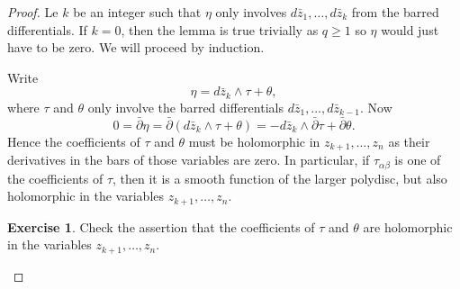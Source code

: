\documentclass[12pt,openany]{book}
\theoremstyle{plain}
\theoremstyle{remark}
\theoremstyle{definition}
\newenvironment{exbox}{%
    \def\FrameCommand{\vrule width 1pt \relax\hspace{10pt}}%
    \MakeFramed{\advance\hsize-\width\FrameRestore}%
}{%
    \endMakeFramed
}
\theoremstyle{exercise}
\newtheorem{exercise}{Exercise}[section]
\theoremstyle{example}
\begin{document}
\begin{proof}
Le $k$ be an integer such that $\eta$ only involves
$d\bar{z}_1,\ldots,d\bar{z}_k$ from the barred differentials.
If $k=0$, then the lemma is true trivially as $q \geq 1$ so $\eta$ would
just have to be zero.
We will proceed by induction.

Write
\begin{equation*}
\eta = d\bar{z}_k \wedge \tau + \theta,
\end{equation*}
where $\tau$ and $\theta$ only involve the barred differentials
$d\bar{z}_1,\ldots,d\bar{z}_{k-1}$.
Now
\begin{equation*}
0 = \bar{\partial} \eta
= \bar{\partial} (d\bar{z}_k \wedge \tau + \theta)
= -d\bar{z}_k \wedge \bar{\partial} \tau + \bar{\partial} \theta .
\end{equation*}
Hence the coefficients of $\tau$ and $\theta$ must be holomorphic in
$z_{k+1},\ldots,z_n$ as their derivatives in the bars of those variables
are zero.
In particular, if $\tau_{\alpha \beta}$ is one of the coefficients
of $\tau$, then it is a smooth function of the larger polydisc, but also
holomorphic in the variables $z_{k+1},\ldots,z_{n}$.

\begin{exbox}
\begin{exercise}
Check the assertion that the coefficients of
$\tau$ and $\theta$ are holomorphic in the variables $z_{k+1},\ldots,z_n$.
\end{exercise}
\end{exbox}



\end{proof}
\end{document}
